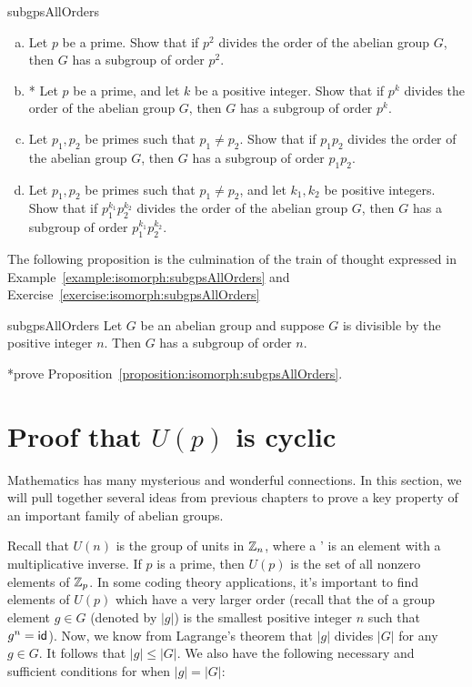 \begin{exercise}{subgpsAllOrders}
\begin{enumerate}[(a)]
\item
Let $p$ be a prime. Show that if $p^2$ divides the order of the abelian group $G$, then $G$ has a subgroup of order $p^2$.
\item
* Let $p$ be a prime, and let $k$ be a positive integer. Show that if $p^k$ divides the order of the abelian group $G$, then $G$ has a subgroup of order $p^k$.
\item
Let $p_1, p_2$ be primes such that $p_1 \neq p_2$.  Show that if $p_1p_2$ divides the order of the abelian group $G$, then $G$ has a subgroup of order $p_1p_2$.
\item
Let $p_1, p_2$ be primes such that $p_1 \neq p_2$, and let $k_1,k_2$ be positive integers.  Show that if $p_1^{k_1}p_2^{k_2}$ divides the order of the abelian group $G$, then $G$ has a subgroup of order $p_1^{k_1}p_2^{k_2}$.
\end{enumerate}
\end{exercise}

The following proposition is the culmination of the train of thought expressed in Example~\ref{example:isomorph:subgpsAllOrders} and Exercise~\ref{exercise:isomorph:subgpsAllOrders}

\begin{prop}{subgpsAllOrders} Let $G$ be an abelian group and suppose $G$ is divisible by the positive integer $n$.  Then $G$ has a subgroup of order $n$.
\end{prop}

\begin{exercise} *prove Proposition~\ref{proposition:isomorph:subgpsAllOrders}.
\end{exercise} 


 
\section{Proof that $U(p)$ is cyclic}
\label{sec:Isomorphism:UpIsCyclic}

Mathematics has many mysterious and wonderful connections. In this section, we will pull together several ideas from previous chapters to prove a key property of an important family of abelian groups.
 
Recall that $U(n)$ is the group of units in $\mathbb{Z}_n$, where a ' is an element with a multiplicative inverse. If $p$ is a prime, then $U(p)$ is the set of all nonzero elements of $\mathbb{Z}_p$. In some coding theory applications, it's important to find elements of $U(p)$ which have a very larger order (recall that the  of a group element $g \in G$ (denoted by $|g|$)  is the smallest positive integer $n$ such that $g^n = {\sf{i}d}$). Now, we know from Lagrange's theorem that $|g|$ divides $|G|$ for any $g \in G$.  It follows that $|g| \le |G|$. We also have the following necessary and sufficient conditions for when $|g|=|G|$:

